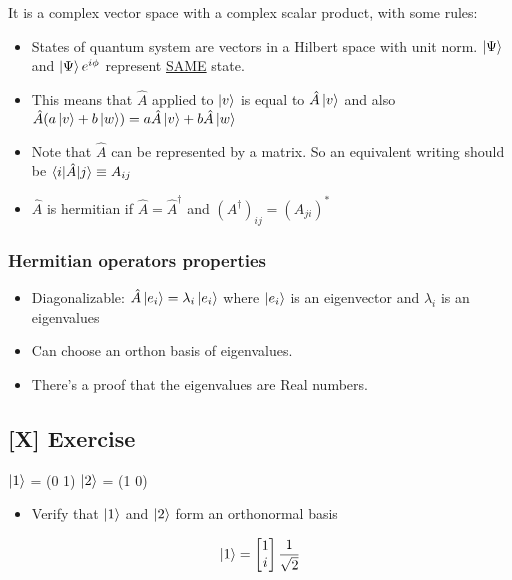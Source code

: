 It is a complex vector space with a complex scalar product, with some rules:

\begin{itemize}
    \item States of quantum system are vectors in a Hilbert space with unit norm. $\ket{\Psi}$ and $\ket{\Psi}e^{i\phi}$ represent \underline{SAME} state.
    \item This means that $\hat{A}$ applied to $\ket{v}$ is equal to $\hat{A}\ket{v}$ and also $\hat{A}(a\ket{v} + b\ket{w}) = a\hat{A}\ket{v} + b\hat{A}\ket{w}$
    \item Note that $\hat{A}$ can be represented by a matrix. So an equivalent writing should be $\braket{i|\hat{A}|j} \equiv A_{ij}$
    \item $\hat{A}$ is hermitian if $\hat{A} = \hat{A}^{\dagger}$ and $(A^{\dagger})_{ij} = (A_{ji})^*$
\end{itemize}

\subsubsection{Hermitian operators properties}

\begin{itemize}
    \item Diagonalizable: $\hat{A} \ket{e_i} = \lambda_i \ket{e_i}$ where $\ket{e_i}$ is an eigenvector and $\lambda_i$ is an eigenvalues
    \item Can choose an orthon basis of eigenvalues.
    \item There's a proof that the eigenvalues are Real numbers.
\end{itemize}

\subsection{[X] Exercise}

$\ket{1}$ = (0 1)
$\ket{2}$ = (1 0)

\begin{itemize}
    \item Verify that $\ket{1}$ and $\ket{2}$ form an orthonormal basis
\end{itemize}

\hrulefill

$$\ket{1} = \begin{bmatrix} 1 \\ i \\ \end{bmatrix}  \frac{1}{\sqrt{2}}$$

